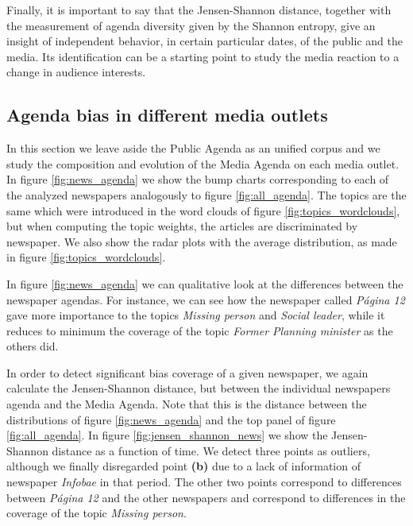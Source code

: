 \documentclass{bmcart}
\begin{document}
\par %
Finally, it is important to say that the Jensen-Shannon distance, together with the measurement of agenda diversity given by the Shannon entropy, give an insight of independent behavior, in certain particular dates,  of the public and the media. Its identification can be a starting point to study the media reaction to a change in audience interests.
 
\subsection*{Agenda bias in different media outlets}

\par In this section we leave aside the Public Agenda as an unified corpus and we study the composition and evolution of the Media Agenda on each media outlet. 
In figure \ref{fig:news_agenda} we show the bump charts corresponding to each of the analyzed newspapers analogously to figure \ref{fig:all_agenda}.
The topics are the same which were introduced in the word clouds of figure \ref{fig:topics_wordclouds}, but when computing the topic weights, the articles are discriminated by newspaper. 
We also show the radar plots with the average distribution, as made in figure \ref{fig:topics_wordclouds}. 

\par In figure \ref{fig:news_agenda} we can qualitative look at the differences between the newspaper agendas.
For instance, we can see how the newspaper called \emph{P\'agina 12} gave more importance to the topics \emph{Missing person} and \emph{Social leader}, while it reduces to minimum the coverage of the topic  \emph{Former Planning minister} as the others did.

\par In order to detect significant bias coverage of a given newspaper, we again calculate the Jensen-Shannon distance, but between the individual newspapers agenda and the Media Agenda.
Note that this is the distance between the distributions of figure \ref{fig:news_agenda} and the top panel of figure \ref{fig:all_agenda}. 
 In figure \ref{fig:jensen_shannon_news} we show the Jensen-Shannon distance as a function of time.
We detect three points as outliers, although we finally disregarded point \textbf{(b)} due to a lack of  information of newspaper \emph{Infobae} in that period. 
The other two points correspond to differences between \emph{P\'agina 12} and the other newspapers and correspond to differences in the coverage of the topic \emph{Missing person}.
\end{document}
